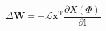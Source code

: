 $$
    \Delta \mathbf{W} 
        = - \mathcal{L} \mathbf{x}^{\mathrm{T}}
            \frac{\partial X(\Phi)}{\partial \mathbf{l}}
$$